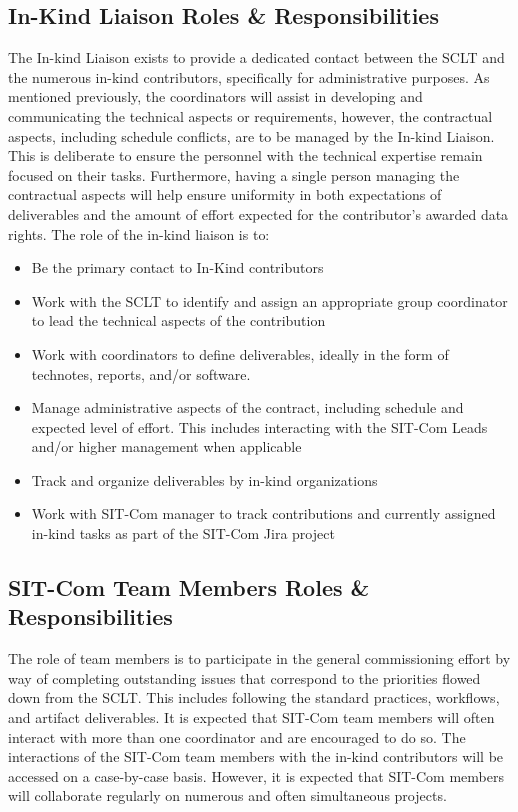 \documentclass[SE,lsstdraft,authoryear,toc]{lsstdoc}
\begin{document}
\subsection{In-Kind Liaison Roles \& Responsibilities}
\label{sec:in_kind_r_and_r}
The In-kind Liaison exists to provide a dedicated contact between the SCLT and the numerous in-kind contributors, specifically for administrative purposes.
As mentioned previously, the coordinators will assist in developing and communicating the technical aspects or requirements, however, the contractual aspects, including schedule conflicts, are to be managed by the In-kind Liaison.
This is deliberate to ensure the personnel with the technical expertise remain focused on their tasks.
Furthermore, having a single person managing the contractual aspects will help ensure uniformity in both expectations of deliverables and the amount of effort expected for the contributor's awarded data rights.
The role of the in-kind liaison is to:
\begin{itemize}
    \item Be the primary contact to In-Kind contributors
    \item Work with the SCLT to identify and assign an appropriate group coordinator to lead the technical aspects of the contribution
    \item Work with coordinators to define deliverables, ideally in the form of technotes, reports, and/or software.
    \item Manage administrative aspects of the contract, including schedule and expected level of effort.
    This includes interacting with the SIT-Com Leads and/or higher management when applicable
    \item Track and organize deliverables by in-kind organizations
    \item Work with SIT-Com manager to track contributions and currently assigned in-kind tasks as part of the SIT-Com Jira project
\end{itemize}

\subsection{SIT-Com Team Members Roles \& Responsibilities}
The role of team members is to participate in the general commissioning effort by way of completing outstanding issues that correspond to the priorities flowed down from the SCLT.
This includes following the standard practices, workflows, and artifact deliverables.
It is expected that SIT-Com team members will often interact with more than one coordinator and are encouraged to do so.
The interactions of the SIT-Com team members with the in-kind contributors will be accessed on a case-by-case basis.
However, it is expected that SIT-Com members will collaborate regularly on numerous and often simultaneous projects.
\end{document}

